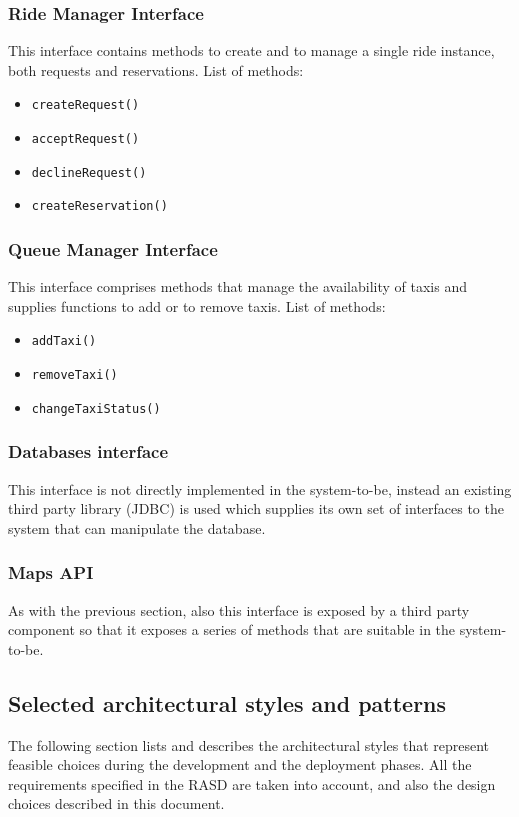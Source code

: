 \subsubsection{Ride Manager Interface}
This interface contains methods to create and to manage a single ride instance, both requests and reservations. \newline
List of methods:
\begin{itemize}
	\item \texttt{createRequest()}
	\item \texttt{acceptRequest()}
	\item \texttt{declineRequest()}
	\item \texttt{createReservation()}
\end{itemize}
\subsubsection{Queue Manager Interface}
This interface comprises methods that manage the availability of taxis and supplies functions to add or to remove taxis. \newline
List of methods:
\begin{itemize}
	\item \texttt{addTaxi()}
	\item \texttt{removeTaxi()}
	\item \texttt{changeTaxiStatus()}
\end{itemize}
\subsubsection{Databases interface}
This interface is not directly implemented in the system-to-be, instead an existing third party library (JDBC) is used which supplies its own set of interfaces to the system that can manipulate the database.
\subsubsection{Maps API}
As with the previous section, also this interface is exposed by a third party component so that it exposes a series of methods that are suitable in the system-to-be.
\subsection{Selected architectural styles and patterns}
\label{sec:arch-styles-patterns}
The following section lists and describes the architectural styles that represent feasible choices during the development and the deployment phases. All the requirements specified in the RASD are taken into account, and also the design choices described in this document. 
